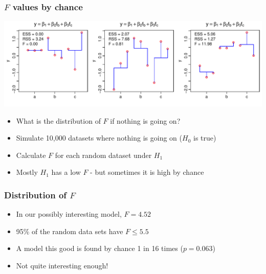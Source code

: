 \documentclass[aspectratio=43]{beamer}
\begin{document}
\begin{frame}[T]
\frametitle{$F$ values by chance}

\includegraphics[width=\textwidth]{F_extremes.pdf}

\begin{itemize}
\item What is the distribution of $F$ if nothing is going on?
\item Simulate 10,000 datasets where nothing is going on ($H_0$ is true)
\item Calculate $F$ for each random dataset under $H_1$
\item Mostly $H_1$ has a low $F$ - but sometimes it is high by chance 
\end{itemize}

\end{frame}


% 

\begin{frame}[T]
\frametitle{Distribution of $F$}


\centerline{}

\begin{itemize}
\item In our possibly interesting model, $F=4.52$
\item<2> 95\% of the random data sets have $F\le 5.5$
\item<2> A model this good is found by chance 1 in 16 times ($p=0.063$)
\item<2> Not quite interesting enough!
\end{itemize}

\end{frame}
\end{document}
